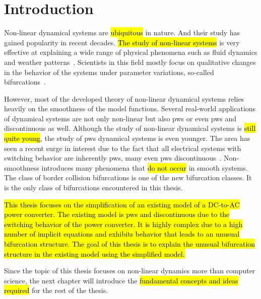 \chapter{Introduction}
\label{chap:intro}

Non-linear dynamical systems are \hl{ubiquitous} in nature.
And their study has gained popularity in recent decades.
\hl{The study of non-linear systems} is very effective at explaining a wide range of physical phenomena such as fluid dynamics and weather patterns~\cite{bernardo2008piecewise}.
Scientists in this field mostly focus on qualitative changes in the behavior of the systems under parameter variations, so-called bifurcations~\cite{simpson2010}.

However, most of the developed theory of non-linear dynamical systems relies heavily on the smoothness of the model functions.
Several real-world applications of dynamical systems are not only non-linear but also \gls{pws} or even \gls{pws} and discontinuous as well.
Although the study of non-linear dynamical systems is \hl{still quite young}, the study of \gls{pws} dynamical systems is even younger.
The area has seen a recent surge in interest due to the fact that all electrical systems with switching behavior are inherently \gls{pws}, many even \gls{pws} discontinuous~\cite{simpson2010}.
Non-smoothness introduces many phenomena that \hl{do not occur} in smooth systems.
The class of border collision bifurcations is one of the new bifurcation classes.
It is the only class of bifurcations encountered in this thesis.

\hl{
	This thesis focuses on the simplification of an existing model of a DC-to-AC power converter.
	The existing model is \gls{pws} and discontinuous due to the switching behavior of the power converter.
	It is highly complex due to a high number of implicit equations and exhibits behavior that leads to an unusual bifurcation structure.
	The goal of this thesis is to explain the unusual bifurcation structure in the existing model using the simplified model.
}

Since the topic of this thesis focuses on non-linear dynamics more than computer science, the next chapter will introduce the \hl{fundamental concepts and ideas required} for the rest of the thesis.
